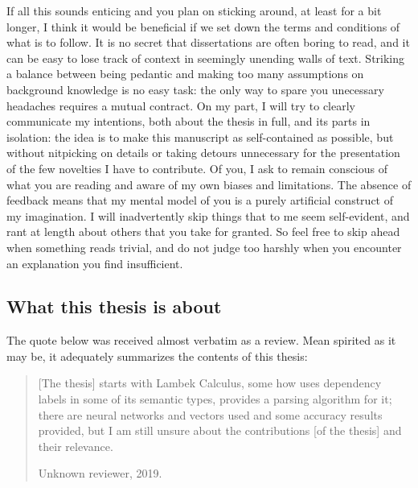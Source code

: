 If all this sounds enticing and you plan on sticking around, at least for a bit longer, I think it would be beneficial if we set down the terms and conditions of what is to follow. 
It is no secret that dissertations are often boring to read, and it can be easy to lose track of context in seemingly unending walls of text. 
Striking a balance between being pedantic and making too many assumptions on background knowledge is no easy task: the only way to spare you unecessary headaches requires a mutual contract. 
On my part, I will try to clearly communicate my intentions, both about the thesis in full, and its parts in isolation: the idea is to make this manuscript as self-contained as possible, but without nitpicking on details or taking detours unnecessary for the presentation of the few novelties I have to contribute.
Of you, I ask to remain conscious of what you are reading and aware of my own biases and limitations. 
The absence of feedback means that my mental model of you is a purely artificial construct of my imagination.
I will inadvertently skip things that to me seem self-evident, and rant at length about others that you take for granted.
So feel free to skip ahead when something reads trivial, and do not judge too harshly when you encounter an explanation you find insufficient.

\newpage

\subsection*{What this thesis is about}
The quote below was received almost verbatim as a review.
Mean spirited as it may be, it adequately summarizes the contents of this thesis:
\begin{quote}
[The thesis] starts with Lambek Calculus, some how uses dependency labels in some of its semantic types, provides a parsing algorithm for it; there are neural networks and vectors used and some accuracy results provided, but I am still unsure about the contributions [of the thesis] and their relevance.
\begin{flushright} Unknown reviewer, 2019.\end{flushright}
\end{quote}


